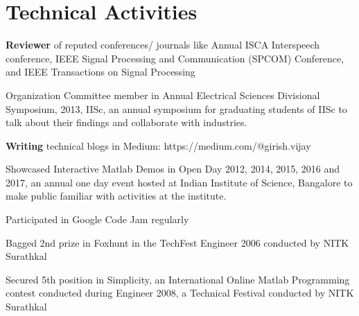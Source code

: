 \documentclass[line]{resume}
\begin{document}
{\begin{resume}
\begin{list2}
			
			
			
			
			
			\end{list2}
			
	
	\vspace{-1.5mm}
			\vspace{-3.5mm}
			\section{\mysidestyle Technical Activities}
			\vspace{4.5mm}
			\begin{list2}
				\item \textbf{Reviewer} of reputed conferences/ journals like Annual ISCA Interspeech conference,  IEEE Signal Processing and Communication (SPCOM) Conference, and IEEE Transactions on Signal Processing
				\item Organization Committee member in Annual Electrical Sciences Divisional Symposium, 2013, IISc, an annual symposium for graduating students of IISc to talk
				about their findings and collaborate with industries.
				\item \textbf{Writing} technical blogs in Medium: https://medium.com/@girish.vijay
				\item Showcased Interactive Matlab Demos in Open Day 2012,  2014, 2015, 2016 and 2017, an annual one day event hosted at Indian Institute of Science, Bangalore to make public familiar with activities at the institute.	\item Participated in Google Code Jam regularly
				
				\item
				Bagged 2nd prize in Foxhunt in the TechFest Engineer 2006
				conducted by NITK Surathkal
				\item
				Secured 5th position in Simplicity, an International
				Online Matlab Programming contest conducted during
				Engineer 2008, a Technical Festival conducted by NITK
				Surathkal
				

\end{list2}
\end{resume}}
\end{document}

